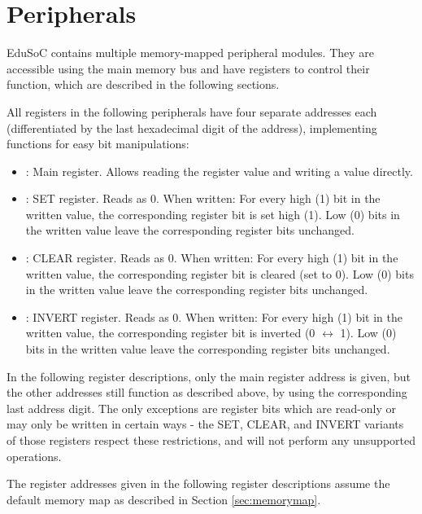 \newcommand{\ub}{\cellcolor{gray!25}\textemdash} %
\newcommand{\bd}[1]{\scriptsize#1\vspace{-2.3mm}} %
\newcommand{\br}[1]{\multirow{2}{*}{#1\vspace{-2.3mm}}} %

\section{Peripherals}\label{sec:peripherals}
EduSoC contains multiple memory-mapped peripheral modules. They are accessible using the main memory bus and have registers to control their function, which are described in the following sections.

All registers in the following peripherals have four separate addresses each (differentiated by the last hexadecimal digit of the address), implementing functions for easy bit manipulations:
\begin{itemize}
    \item {}: Main register. Allows reading the register value and writing a value directly.
    \item {}: SET register. Reads as 0. When written: For every high (1) bit in the written value, the corresponding register bit is set high (1). Low (0) bits in the written value leave the corresponding register bits unchanged.
    \item {}: CLEAR register. Reads as 0. When written: For every high (1) bit in the written value, the corresponding register bit is cleared (set to 0). Low (0) bits in the written value leave the corresponding register bits unchanged.
    \item {}: INVERT register. Reads as 0. When written: For every high (1) bit in the written value, the corresponding register bit is inverted (0 $\leftrightarrow$ 1). Low (0) bits in the written value leave the corresponding register bits unchanged.
\end{itemize}
In the following register descriptions, only the main register address is given, but the other addresses still function as described above, by using the corresponding last address digit.
The only exceptions are register bits which are read-only or may only be written in certain ways - the SET, CLEAR, and INVERT variants of those registers respect these restrictions, and will not perform any unsupported operations.

The register addresses given in the following register descriptions assume the default memory map as described in Section \ref{sec:memorymap}.








